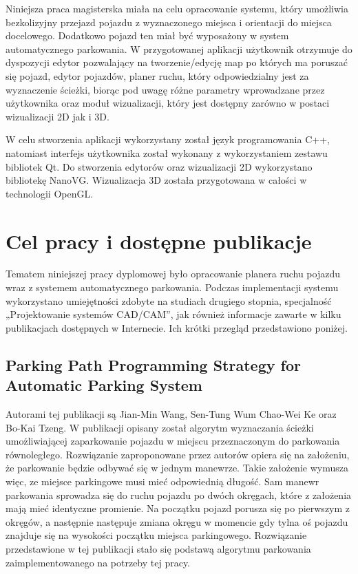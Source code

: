 \documentclass[a4paper,11pt,twoside]{report}
\theoremstyle{definition}
\begin{document}
Niniejsza praca magisterska miała na celu opracowanie systemu, który umożliwia bezkolizyjny przejazd pojazdu z wyznaczonego miejsca i orientacji do miejsca docelowego. Dodatkowo pojazd ten miał być wyposażony w system automatycznego parkowania. W przygotowanej aplikacji użytkownik otrzymuje do dyspozycji edytor pozwalający na tworzenie/edycję map po których ma poruszać się pojazd, edytor pojazdów, planer ruchu, który odpowiedzialny jest za wyznaczenie ścieżki, biorąc pod uwagę różne parametry wprowadzane przez użytkownika oraz moduł wizualizacji, który jest dostępny zarówno w postaci wizualizacji 2D jak i 3D. 

W celu stworzenia aplikacji wykorzystany został język programowania C++, natomiast interfejs użytkownika został wykonany z wykorzystaniem zestawu bibliotek Qt. Do stworzenia edytorów oraz wizualizacji 2D wykorzystano bibliotekę NanoVG. Wizualizacja 3D została przygotowana w całości w technologii OpenGL.

\chapter{Cel pracy i dostępne publikacje}

Tematem niniejszej pracy dyplomowej było opracowanie planera ruchu pojazdu wraz z systemem automatycznego parkowania. Podczas implementacji systemu wykorzystano umiejętności zdobyte na studiach drugiego stopnia, specjalność „Projektowanie systemów CAD/CAM”, jak również informacje zawarte w kilku publikacjach dostępnych w Internecie. Ich krótki przegląd przedstawiono poniżej. 

\section{Parking Path Programming Strategy for Automatic Parking System}

Autorami tej publikacji są Jian-Min Wang, Sen-Tung Wum Chao-Wei Ke oraz Bo-Kai Tzeng. W publikacji opisany został algorytm wyznaczania ścieżki umożliwiającej zaparkowanie pojazdu w miejscu przeznaczonym do parkowania równoległego. Rozwiązanie zaproponowane przez autorów opiera się na założeniu, że parkowanie będzie odbywać się w jednym manewrze. Takie założenie wymusza więc, ze miejsce parkingowe musi mieć odpowiednią długość. Sam manewr parkowania sprowadza się do ruchu pojazdu po dwóch okręgach, które z założenia mają mieć identyczne promienie. Na początku pojazd porusza się po pierwszym z okręgów, a następnie następuje zmiana okręgu w momencie gdy tylna oś pojazdu znajduje się na wysokości początku miejsca parkingowego. Rozwiązanie przedstawione w tej publikacji stało się podstawą algorytmu parkowania zaimplementowanego na potrzeby tej pracy.
 
\end{document}
